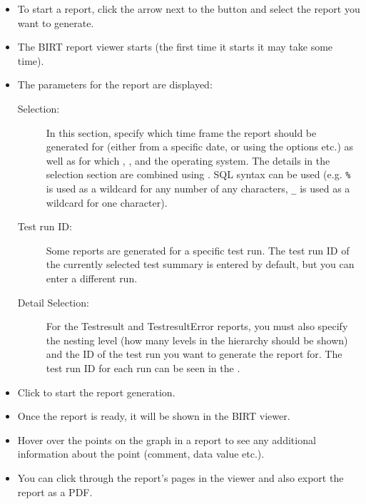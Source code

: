 \begin{itemize}
\item To start a report, click the arrow next to the  button and select the report you want to generate.


\item The BIRT report viewer starts (the first time it starts it may take some time).
\item The parameters for the report are displayed:
\begin{description}
\item [Selection:]{In this section, specify which time frame the report should be generated for (either from a specific date, or using the options  etc.) as well as for which \gdproject{}, \gdsuite{}, \gdjob{} and the operating system.  The details in the selection section are combined using . SQL syntax can be used (e.g. \verb+%+ is used as a wildcard for any number of any characters, \verb+_+ is used as a wildcard for one character). }
\item [Test run ID:]{Some reports are generated for a specific test run. The test run ID of the currently selected test summary is entered by default, but you can enter a different run.}
\item [Detail Selection:]{For the Testresult and TestresultError reports, you must also specify the nesting level (how many levels in the hierarchy should be shown) and the ID of the test run you want to generate the report for. The test run ID for each run can be seen in the \gdtestsummaryview{}.}
\end{description}

\item Click  to start the report generation. 
\item Once the report is ready, it will be shown in the BIRT viewer.
\item Hover over  the points on the graph in a report to see any additional information about the point (comment, data value etc.). 
\item You can click through the report's pages in the viewer and also export the report as a PDF. 

\end{itemize}
